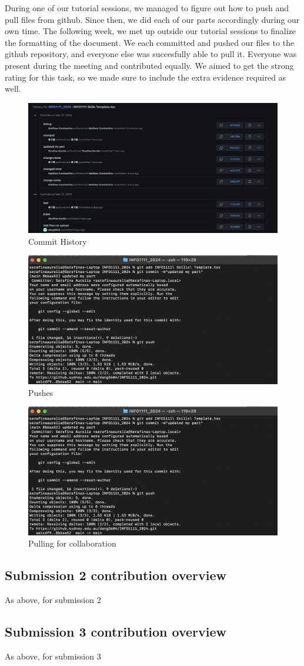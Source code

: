 \documentclass[a4paper, 11pt]{report}
\begin{document}
During one of our tutorial sessions, we managed to figure out how to push and pull files from github. Since then, we did each of our parts accordingly during our own time. The following week, we met up outside our tutorial sessions to finalize the formatting of the document. We each committed and pushed our files to the github repository, and everyone else 
was succesfully able to pull it. Everyone was present during the meeting and contributed equally. We aimed to get the strong rating for this task, so we made sure to include the extra evidence required as well.\\
\begin{figure}[h]
    \centering
    \includegraphics[width=0.5\linewidth]{commits.png}
    \caption{Commit History}
\end{figure}

\begin{figure}[h]
    \centering
    \includegraphics[width=0.5\linewidth]{push.png}
    \caption{Pushes}
\end{figure}

\begin{figure}
    \centering
    \includegraphics[width=0.5\linewidth]{pull.png}
    \caption{Pulling for collaboration}
\end{figure}


\subsection{Submission 2 contribution overview}

As above, for submission 2

\subsection{Submission 3 contribution overview}

As above, for submission 3



\newpage



\end{document}
